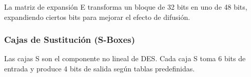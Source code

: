 La matriz de expansión E transforma un bloque de 32 bits en uno de 48 bits, expandiendo ciertos bits para mejorar el efecto de difusión.






\subsubsection{Cajas de Sustitución (S-Boxes)}

Las cajas S son el componente no lineal de DES. Cada caja S toma 6 bits de entrada y produce 4 bits de salida según tablas predefinidas.



